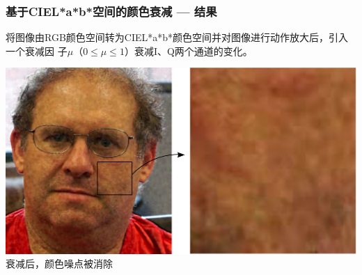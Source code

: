 \documentclass[xcolor=svgnames,serif,table]{beamer}
\begin{document}
\begin{frame}
  \frametitle{基于CIEL*a*b*空间的颜色衰减 --- 结果}
  \small
  将图像由RGB颜色空间转为CIEL*a*b*颜色空间并对图像进行动作放大后，引入一个衰减因
  子\alert{$\mu$}（$0\le \mu \le 1$）衰减I、Q两个通道的变化。

  \begin{center}
    \includegraphics[width=.8\textwidth]{attenuation-after.png}\\
    衰减后，颜色噪点被消除
  \end{center}
\end{frame}
\end{document}
